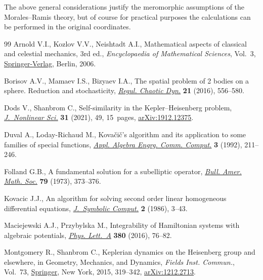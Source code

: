 \documentclass[11pt]{article}
\numberwithin{equation}{section}
\numberwithin{equation}{section}
\begin{document}
The above general considerations justify the meromorphic assumptions
of the Morales--Ramis theory, but of course for practical purposes the
calculations can be performed in the original coordinates.
\begin{thebibliography}{99}
Arnold V.I., Kozlov V.V., Neishtadt A.I., Mathematical aspects of classical and
 celestial mechanics, 3rd ed., \textit{Encyclopaedia of Mathematical Sciences}, Vol.~3, \href{https://doi.org/10.1007/978-3-540-48926-9}{Springer-Verlag}, Berlin, 2006.

Borisov A.V., Mamaev I.S., Bizyaev I.A., The spatial problem of 2 bodies on a
 sphere. {R}eduction and stochasticity, \href{https://doi.org/10.1134/S1560354716050075}{\textit{Regul. Chaotic Dyn.}}
 \textbf{21} (2016), 556--580.

Dods V., Shanbrom C., Self-similarity in the {K}epler--{H}eisenberg problem,
 \href{https://doi.org/10.1007/s00332-021-09709-1}{\textit{J.~Nonlinear Sci.}} \textbf{31} (2021), 49, 15~pages,
 \href{https://arxiv.org/abs/1912.12375}{arXiv:1912.12375}.

Duval A., Loday-Richaud M., Kova\v{c}i\v{c}'s algorithm and its application to
 some families of special functions, \href{https://doi.org/10.1007/BF01268661}{\textit{Appl. Algebra Engrg. Comm.
 Comput.}} \textbf{3} (1992), 211--246.

Folland G.B., A fundamental solution for a subelliptic operator, \href{https://doi.org/10.1090/S0002-9904-1973-13171-4}{\textit{Bull.
 Amer. Math. Soc.}} \textbf{79} (1973), 373--376.

Kovacic J.J., An algorithm for solving second order linear homogeneous
 differential equations, \href{https://doi.org/10.1016/S0747-7171(86)80010-4}{\textit{J.~Symbolic Comput.}} \textbf{2} (1986),
 3--43.

Maciejewski A.J., Przybylska M., Integrability of {H}amiltonian systems with
 algebraic potentials, \href{https://doi.org/10.1016/j.physleta.2015.08.035}{\textit{Phys. Lett.~A}} \textbf{380} (2016), 76--82.

Montgomery R., Shanbrom C., Keplerian dynamics on the {H}eisenberg group and
 elsewhere, in Geo\-met\-ry, Mechanics, and Dynamics, \textit{Fields Inst.
 Commun.}, Vol.~73, \href{https://doi.org/10.1007/978-1-4939-2441-7_14}{Springer}, New York, 2015, 319--342, \href{https://arxiv.org/abs/1212.2713}{arXiv:1212.2713}.


\end{thebibliography}
\end{document}
